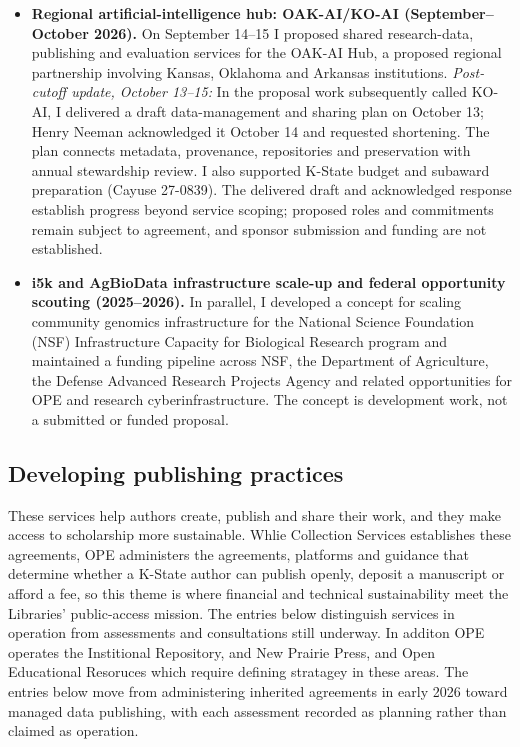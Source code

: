 \begin{itemize}
\item \textbf{Regional artificial-intelligence hub: OAK-AI/KO-AI (September--October 2026).}\label{update-koai} On September 14--15 I proposed shared research-data, publishing and evaluation services for the OAK-AI Hub, a proposed regional partnership involving Kansas, Oklahoma and Arkansas institutions. \textit{Post-cutoff update, October 13--15:} In the proposal work subsequently called KO-AI, I delivered a draft data-management and sharing plan on October 13; Henry Neeman acknowledged it October 14 and requested shortening. The plan connects metadata, provenance, repositories and preservation with annual stewardship review. I also supported K-State budget and subaward preparation (Cayuse 27-0839). The delivered draft and acknowledged response establish progress beyond service scoping; proposed roles and commitments remain subject to agreement, and sponsor submission and funding are not established.
\item \textbf{i5k and AgBioData infrastructure scale-up and federal opportunity scouting (2025--2026).} In parallel, I developed a concept for scaling community genomics infrastructure for the National Science Foundation (NSF) Infrastructure Capacity for Biological Research program and maintained a funding pipeline across NSF, the Department of Agriculture, the Defense Advanced Research Projects Agency and related opportunities for OPE and research cyberinfrastructure. The concept is development work, not a submitted or funded proposal.
\end{itemize}

\subsection{Developing publishing practices}
These services help authors create, publish and share their work, and they make access to scholarship more sustainable. Whlie Collection Services establishes these agreements, OPE administers the agreements, platforms and guidance that determine whether a K-State author can publish openly, deposit a manuscript or afford a fee, so this theme is where financial and technical sustainability meet the Libraries' public-access mission. The entries below distinguish services in operation from assessments and consultations still underway. In additon OPE operates the Institional Repository, and New Prairie Press, and Open Educational Resoruces which require defining stratagey in these areas. The entries below move from administering inherited agreements in early 2026 toward managed data publishing, with each assessment recorded as planning rather than claimed as operation.

